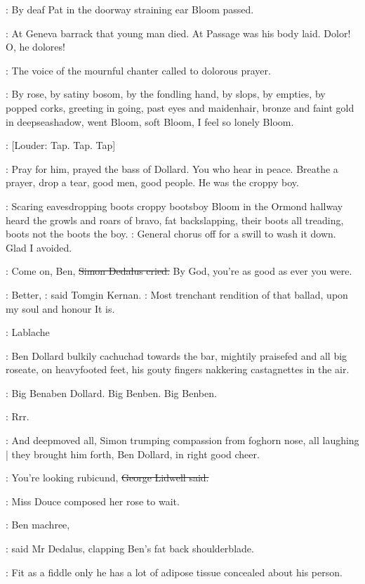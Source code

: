:
By deaf Pat in the doorway
straining ear Bloom passed.

\BloomInt:
At Geneva barrack that young man died.
At Passage was his body
laid.
Dolor!
O,
he dolores!

:
The voice of the mournful chanter called to
dolorous prayer.

:
By rose,
by satiny bosom,
by the fondling hand,
by slops,
by empties,
by popped corks,
greeting in going,
past eyes and maidenhair,
bronze and
faint gold in deepseashadow,
went Bloom,
soft Bloom,
I feel so lonely
Bloom.

\stripling:
[Louder:
Tap.
Tap.
Tap]

:
Pray for him,
prayed the bass of Dollard.
You who hear in peace.
Breathe
a prayer,
drop a tear,
good men,
good people.
He was the croppy boy.

:
Scaring eavesdropping boots croppy bootsboy Bloom in the Ormond
hallway heard the growls and roars of bravo,
fat backslapping,
their boots
all treading,
boots not the boots the boy.
\BloomInt:
General chorus off for a swill
to wash it down.
Glad I avoided.

\simon:
Come on,
Ben,
\sout{Simon Dedalus cried.}
By God,
you're as good as ever you were.

:
Better,
:
said Tomgin Kernan.
:
Most trenchant rendition of that ballad,
upon my soul and honour It is.

\cowley:
Lablache

:
Ben Dollard bulkily cachuchad towards the bar,
mightily praisefed and all
big roseate,
on heavyfooted feet,
his gouty fingers nakkering castagnettes
in the air.

\BloomInt:
Big Benaben Dollard.
Big Benben.
Big Benben.

\BloomInt:
Rrr.

:
And deepmoved all,
Simon trumping compassion from foghorn nose,
all laughing |
they brought him forth,
Ben Dollard,
in right good cheer.

\lidwell:
You're looking rubicund,
\sout{George Lidwell said.}

:
Miss Douce composed her rose to wait.

\simon:
Ben machree,

:
said Mr Dedalus,
clapping Ben's fat back shoulderblade.

\simon:
Fit as a fiddle only he has a lot of adipose tissue concealed about his
person.

